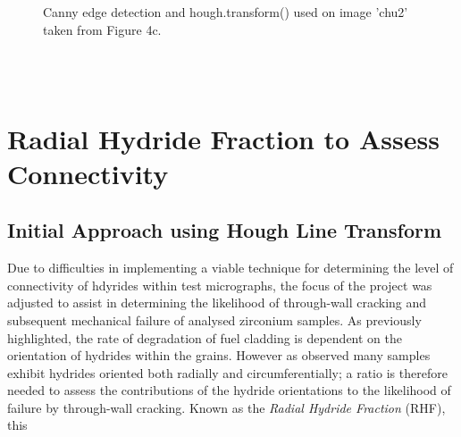 \documentclass{article}
\begin{document}
	\begin{figure}[h]
		\centering
		\hfill
		\caption{Canny edge detection and hough.transform() used on image 'chu2' taken from Figure 4c. }
		\label{Skeletonise2}
	\end{figure}
	\\
\pagebreak
\\
\section{Radial Hydride Fraction to Assess Connectivity}
\subsection{Initial Approach using Hough Line Transform}


Due to difficulties in implementing a viable technique for determining the level of connectivity of hdyrides within test micrographs, the focus of the project was adjusted to assist in determining the likelihood of through-wall cracking and subsequent mechanical failure of analysed zirconium samples. As previously highlighted, the rate of degradation of fuel cladding is dependent on the orientation of hydrides within the grains. However as observed many samples exhibit hydrides oriented both radially and circumferentially; a ratio is therefore needed to assess the contributions of the hydride orientations to the likelihood of failure by through-wall cracking. Known as the \textit{Radial Hydride Fraction} (RHF), this
\end{document}
